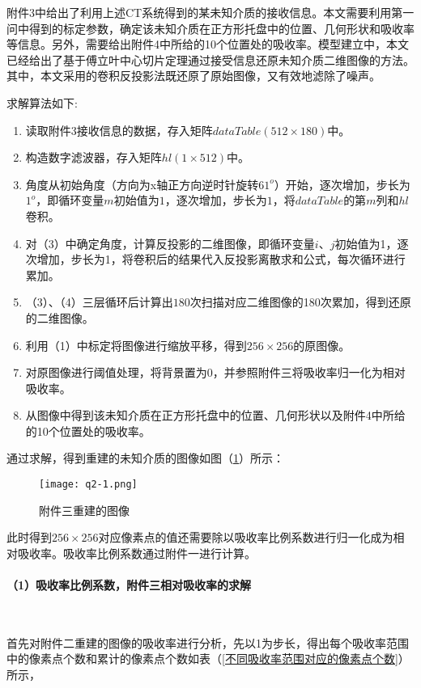 \documentclass[withoutpreface,bwprint]{cumcmthesis} %
\begin{document}
\par 附件3中给出了利用上述CT系统得到的某未知介质的接收信息。本文需要利用第一问中得到的标定参数，确定该未知介质在正方形托盘中的位置、几何形状和吸收率等信息。另外，需要给出附件4中所给的10个位置处的吸收率。模型建立中，本文已经给出了基于傅立叶中心切片定理通过接受信息还原未知介质二维图像的方法。其中，本文采用的卷积反投影法既还原了原始图像，又有效地滤除了噪声。
\par 求解算法如下:
\begin{enumerate}
	\item 读取附件3接收信息的数据，存入矩阵$dataTable(512\times180)$中。
	\item 构造数字滤波器，存入矩阵$hl(1\times 512)$中。
	\item 角度从初始角度（方向为x轴正方向逆时针旋转$61^o$）开始，逐次增加，步长为$1^o$，即循环变量$m$初始值为$1$，逐次增加，步长为$1$，将$dataTable$的第$m$列和$hl$卷积。
	\item 对（3）中确定角度，计算反投影的二维图像，即循环变量$i$、$j$初始值为1，逐次增加，步长为1，将卷积后的结果代入反投影离散求和公式，每次循环进行累加。
	\item （3）、（4）三层循环后计算出$180$次扫描对应二维图像的180次累加，得到还原的二维图像。
	\item 利用（1）中标定将图像进行缩放平移，得到$256\times 256$的原图像。
	\item 对原图像进行阈值处理，将背景置为0，并参照附件三将吸收率归一化为相对吸收率。
	\item 从图像中得到该未知介质在正方形托盘中的位置、几何形状以及附件4中所给的10个位置处的吸收率。
\end{enumerate}


\par 通过求解，得到重建的未知介质的图像如图（\ref{fig:q2-1}）所示：
\begin{figure}[h]
\small
\centering
\texttt{[image: q2-1.png]}
\caption{附件三重建的图像} \label{fig:q2-1}
\end{figure}


\par 此时得到$256\times 256$对应像素点的值还需要除以吸收率比例系数进行归一化成为相对吸收率。吸收率比例系数通过附件一进行计算。

\paragraph*{（1）吸收率比例系数，附件三相对吸收率的求解}~\\

\par 首先对附件二重建的图像的吸收率进行分析，先以1为步长，得出每个吸收率范围中的像素点个数和累计的像素点个数如表（\ref{不同吸收率范围对应的像素点个数}）所示，
\end{document}
